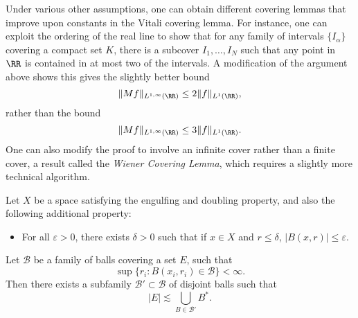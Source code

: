 Under various other assumptions, one can obtain different covering lemmas that improve upon constants in the Vitali covering lemma. For instance, one can exploit the ordering of the real line to show that for any family of intervals $\{ I_\alpha \}$ covering a compact set $K$, there is a subcover $I_1,\dots, I_N$ such that any point in $\RR$ is contained in at most two of the intervals. A modification of the argument above shows this gives the slightly better bound
%
\[ \| Mf \|_{L^{1,\infty}(\RR)} \leq 2 \| f \|_{L^1(\RR)}, \]
%
rather than the bound
%
\[ \| Mf \|_{L^{1,\infty}(\RR)} \leq 3 \| f \|_{L^1(\RR)}. \]
%
One can also modify the proof to involve an infinite cover rather than a finite cover, a result called the \emph{Wiener Covering Lemma}, which requires a slightly more technical algorithm.

\begin{lemma}
    Let $X$ be a space satisfying the engulfing and doubling property, and also the following additional property:
    \begin{itemize}
        \item For all $\varepsilon > 0$, there exists $\delta > 0$ such that if $x \in X$ and $r \leq \delta$, $|B(x,r)| \leq \varepsilon$.
    \end{itemize}
    Let $\mathcal{B}$ be a family of balls covering a set $E$, such that
    \[ \sup \{ r_i : B(x_i,r_i) \in \mathcal{B} \} < \infty. \]
    Then there exists a subfamily $\mathcal{B}' \subset \mathcal{B}$ of disjoint balls such that
    \[ |E| \lesssim \bigcup_{B \in \mathcal{B}'} B^*. \]
\end{lemma}

